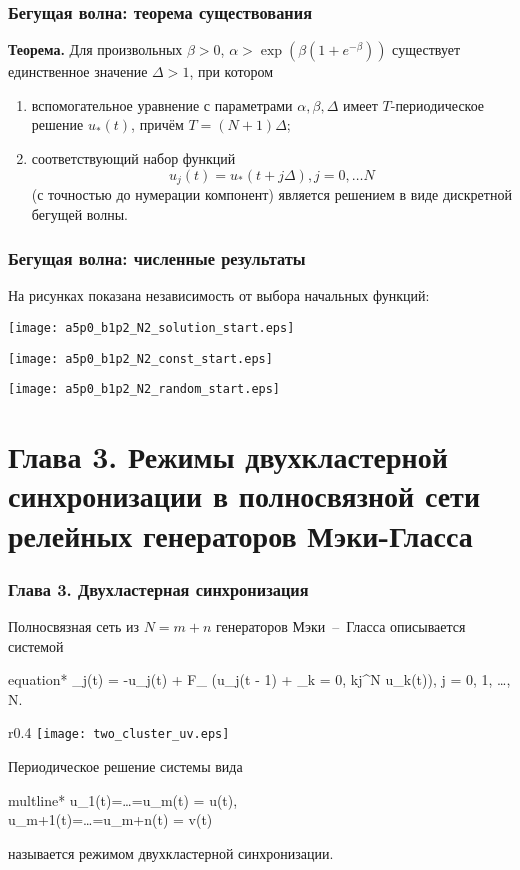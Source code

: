 \begin{frame}
	\frametitle{Бегущая волна: теорема существования}
	
	\textbf{Теорема.} 
	Для произвольных $\beta > 0$, $\alpha > \exp\left(\beta(1 + e^{-\beta})\right)$
	существует единственное значение $\Delta > 1$, при котором 
	\begin{enumerate}
		\item вспомогательное уравнение с параметрами $\alpha, \beta, \Delta$ имеет $T$-периодическое решение $u_*(t)$, причём $T = (N + 1) \Delta$;
		\item соответствующий набор функций
		\[u_j(t) = u_*(t + j \Delta), j = 0, \ldots N\]
		(с точностью до нумерации компонент) является решением в виде дискретной бегущей волны.
	\end{enumerate}
	
\end{frame}

\begin{frame}
	\frametitle{Бегущая волна: численные результаты}
	
	На рисунках показана независимость от выбора начальных функций:
	
	\begin{center}
		\texttt{[image: a5p0\_b1p2\_N2\_solution\_start.eps]}
		
		\texttt{[image: a5p0\_b1p2\_N2\_const\_start.eps]}
		
		\texttt{[image: a5p0\_b1p2\_N2\_random\_start.eps]}
	\end{center}
\end{frame}

\section{Глава 3. Режимы двухкластерной синхронизации в полносвязной сети релейных генераторов Мэки-Гласса}

\begin{frame}
	\frametitle{Глава 3. Двухластерная синхронизация}
	
	Полносвязная сеть из $N = m + n$ генераторов Мэки~--~Гласса описывается системой	
	\begin{empheq}[box=\myeq]{equation*}
		_j(t) = -\beta u_j(t) + \alpha F_{\gamma} \bigg(u_j(t - 1) + \delta\sum\limits_{k = 0, k\neq j}^N u_k(t)\bigg), \quad j = 0, 1, \dots, N.
	\end{empheq}
	
	\begin{wrapfigure}{r}{0.4\textwidth} 
		\vspace{-23pt} 
		\centering
		\texttt{[image: two\_cluster\_uv.eps]}
	\end{wrapfigure}
	
	Периодическое решение системы вида
	\begin{empheq}[box=\myeq]{multline*}
		u_1(t)=\ldots=u_m(t) = u(t),\\u_{m+1}(t)=\ldots=u_{m+n}(t) = v(t)
	\end{empheq}
	называется режимом двухкластерной синхронизации.
	
\end{frame}

